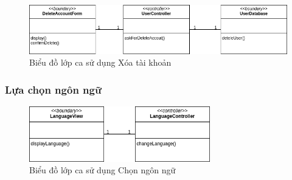 \begin{figure}[H]
    \centering
    \includegraphics[width=\textwidth]{img2.2/Analysis-Xóa tài khoản.drawio.png}
    \caption{Biểu đồ lớp ca sử dụng Xóa tài khoản}
\end{figure}

\subsubsection{Lựa chọn ngôn ngữ}
\begin{figure}[H]
    \centering
    \includegraphics[width=0.7\textwidth]{img2.2/Analysis-Thay đổi ngôn ngữ.drawio.png}
    \caption{Biểu đồ lớp ca sử dụng Chọn ngôn ngữ}
\end{figure}

